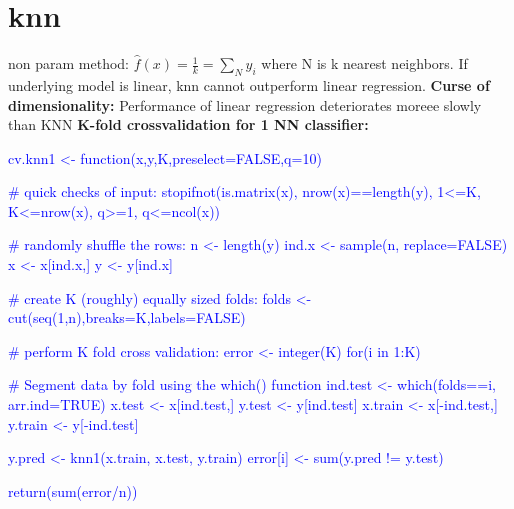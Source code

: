 \section{knn}
non param method: $\hat f(x) = \frac{1}{k} = \sum_N y_i$ where N is k nearest neighbors. If underlying model is linear, knn cannot outperform linear regression.
\textbf{Curse of dimensionality: } Performance of linear regression deteriorates moreee slowly than KNN
\textbf{K-fold crossvalidation for 1 NN classifier: } \textcolor{blue}{cv.knn1 <- function(x,y,K,preselect=FALSE,q=10){
  # quick checks of input:
  stopifnot(is.matrix(x), nrow(x)==length(y), 1<=K, K<=nrow(x),
            q>=1, q<=ncol(x))

  # randomly shuffle the rows:
  n <- length(y)
  ind.x <- sample(n, replace=FALSE)
  x <- x[ind.x,]
  y <- y[ind.x]
  
  # create K (roughly) equally sized folds:
  folds <- cut(seq(1,n),breaks=K,labels=FALSE)
  
  # perform K fold cross validation:
  error <- integer(K)
  for(i in 1:K){
    # Segment data by fold using the which() function 
    ind.test <- which(folds==i, arr.ind=TRUE)
    x.test <- x[ind.test,]
    y.test <- y[ind.test]
    x.train <- x[-ind.test,]
    y.train <- y[-ind.test]
    
    y.pred <- knn1(x.train, x.test, y.train)  
    error[i] <- sum(y.pred != y.test)
  }
  return(sum(error/n))
}}
